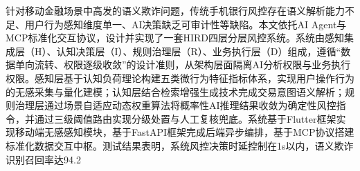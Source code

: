 针对移动金融场景中高发的语义欺诈问题，传统手机银行风控存在语义解析能力不足、用户行为感知维度单一、AI决策缺乏可审计性等缺陷。本文依托AI Agent与MCP标准化交互协议，设计并实现了一套HIRD四层分层风控系统。系统由感知集成层（H）、认知决策层（I）、规则治理层（R）、业务执行层（D）组成，遵循“数据单向流转、权限逐级收敛”的设计准则，从架构层面隔离AI分析权限与业务执行权限。感知层基于认知负荷理论构建五类微行为特征指标体系，实现用户操作行为的无感采集与量化建模；认知层结合检索增强生成技术完成交易意图语义解析；规则治理层通过场景自适应动态权重算法将概率性AI推理结果收敛为确定性风控指令，并通过三级阈值路由实现分级处置与人工复核兜底。系统基于Flutter框架实现移动端无感感知模块，基于FastAPI框架完成后端异步编排，基于MCP协议搭建标准化数据交互中枢。测试结果表明，系统风控决策时延控制在1s以内，语义欺诈识别召回率达94.2%
